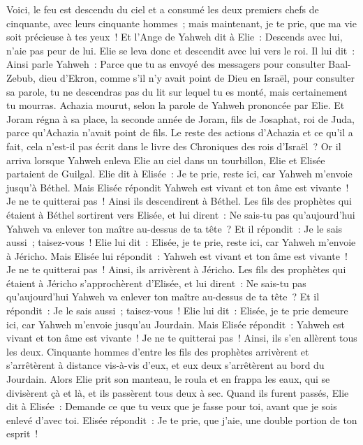 \begin{multicols}{2}
Voici, le feu est descendu du ciel et a consumé les deux premiers chefs de cinquante, avec leurs cinquante hommes~; mais maintenant, je te prie, que ma vie soit précieuse à tes yeux~!
Et l'Ange de Yahweh dit à Elie~: Descends avec lui, n'aie pas peur de lui. Elie se leva donc et descendit avec lui vers le roi.
Il lui dit~: Ainsi parle Yahweh~: Parce que tu as envoyé des messagers pour consulter Baal-Zebub, dieu d'Ekron, comme s'il n'y avait point de Dieu en Israël, pour consulter sa parole, tu ne descendras pas du lit sur lequel tu es monté, mais certainement tu mourras.
Achazia mourut, selon la parole de Yahweh prononcée par Elie. Et Joram régna à sa place, la seconde année de Joram, fils de Josaphat, roi de Juda, parce qu'Achazia n'avait point de fils.
Le reste des actions d'Achazia et ce qu'il a fait, cela n'est-il pas écrit dans le livre des Chroniques des rois d'Israël~?
\VerseOne{}Or il arriva lorsque Yahweh enleva Elie au ciel dans un tourbillon, Elie et Elisée partaient de Guilgal.
Elie dit à Elisée~: Je te prie, reste ici, car Yahweh m'envoie jusqu'à Béthel. Mais Elisée répondit Yahweh est vivant et ton âme est vivante~! Je ne te quitterai pas~! Ainsi ils descendirent à Béthel.
Les fils des prophètes qui étaient à Béthel sortirent vers Elisée, et lui dirent~: Ne sais-tu pas qu'aujourd'hui Yahweh va enlever ton maître au-dessus de ta tête~? Et il répondit~: Je le sais aussi~; taisez-vous~!
Elie lui dit~: Elisée, je te prie, reste ici, car Yahweh m'envoie à Jéricho. Mais Elisée lui répondit~: Yahweh est vivant et ton âme est vivante~! Je ne te quitterai pas~! Ainsi, ils arrivèrent à Jéricho.
Les fils des prophètes qui étaient à Jéricho s'approchèrent d'Elisée, et lui dirent~: Ne sais-tu pas qu'aujourd'hui Yahweh va enlever ton maître au-dessus de ta tête~? Et il répondit~: Je le sais aussi~; taisez-vous~!
Elie lui dit~: Elisée, je te prie demeure ici, car Yahweh m'envoie jusqu'au Jourdain. Mais Elisée répondit~: Yahweh est vivant et ton âme est vivante~! Je ne te quitterai pas~! Ainsi, ils s'en allèrent tous les deux.
Cinquante hommes d'entre les fils des prophètes arrivèrent et s'arrêtèrent à distance vis-à-vis d'eux, et eux deux s'arrêtèrent au bord du Jourdain.
Alors Elie prit son manteau, le roula et en frappa les eaux, qui se divisèrent çà et là, et ils passèrent tous deux à sec.
Quand ils furent passés, Elie dit à Elisée~: Demande ce que tu veux que je fasse pour toi, avant que je sois enlevé d'avec toi. Elisée répondit~: Je te prie, que j'aie, une double portion de ton esprit~!

\end{multicols}
